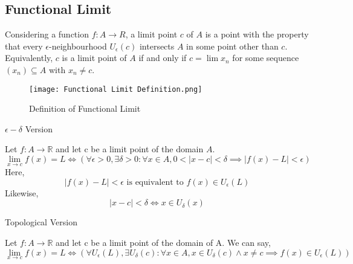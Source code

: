 
\subsection{Functional Limit}
Considering a function $f:A \to R$, a limit point $c$ of $A$ is a point with the property that every $\epsilon$-neighbourhood $U_\epsilon(c)$ intersects $A$ in some point other than $c$. Equivalently, $c$ is a limit point of $A$  if and only if $c=\lim x_n$ for some sequence $(x_n) \subseteq A$ with $x_n \neq c$. \\
\begin{figure}[htpb]
    \centering
    \texttt{[image: Functional Limit Definition.png]}
    \caption{\small Definition of Functional Limit}
\end{figure}

\begin{definition}{$\epsilon-\delta$ Version}

Let $f: A \to \mathbb{R}$ and let c be a limit point of the domain $A$. \[
    \lim_{x \to c} f(x) = L \iff (\forall \epsilon>0, \exists\delta>0 : \forall x \in A, 0 < |x-c| < \delta \implies |f(x)-L| < \epsilon)
\]
Here, \[
    |f(x)-L|<\epsilon \text{ is equivalent to } f(x) \in U_\epsilon(L)
\]
Likewise, \[
    |x-c|<\delta \iff x \in U_\delta(x)
\]
\end{definition}

\begin{definition}{Topological Version}

    Let $f : A \to \mathbb{R}$ and let c be a limit point of the domain of A. We can say, \[
        \lim_{x \to c} f(x)=L \iff ( \forall U_\epsilon(L), \exists U_\delta(c) : \forall x \in A, x \in U_\delta(c) \land x \neq c \implies f(x) \in U_\epsilon(L) )
    \] \\
\end{definition}


